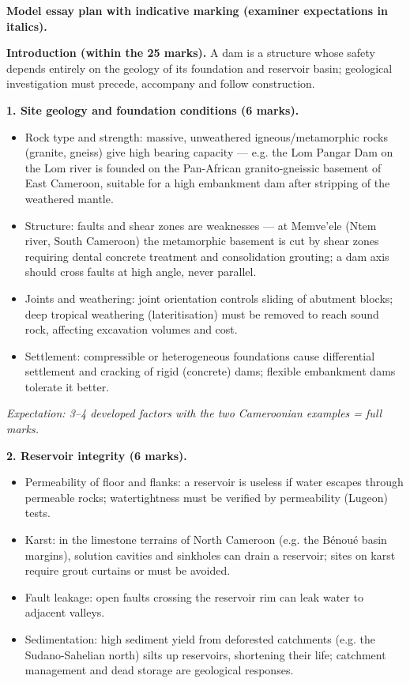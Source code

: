\documentclass[11pt]{article}
\newcommand{\cle}[1]{{\popxbold\color{popdark}#1}}
\begin{document}
\begin{corrige}
\textbf{Model essay plan with indicative marking (examiner expectations in italics).}

\textbf{Introduction (within the 25 marks).} A dam is a structure whose safety depends entirely on the geology of its foundation and reservoir basin; geological investigation must precede, accompany and follow construction.

\textbf{1. Site geology and foundation conditions (6 marks).}
\begin{itemize}
\item Rock type and strength: massive, unweathered igneous/metamorphic rocks (granite, gneiss) give high bearing capacity --- e.g. the \cle{Lom Pangar Dam} on the Lom river is founded on the Pan-African granito-gneissic basement of East Cameroon, suitable for a high embankment dam after stripping of the weathered mantle.
\item Structure: faults and shear zones are weaknesses --- at \cle{Memve'ele} (Ntem river, South Cameroon) the metamorphic basement is cut by shear zones requiring dental concrete treatment and consolidation grouting; a dam axis should cross faults at high angle, never parallel.
\item Joints and weathering: joint orientation controls sliding of abutment blocks; deep tropical weathering (lateritisation) must be removed to reach sound rock, affecting excavation volumes and cost.
\item Settlement: compressible or heterogeneous foundations cause differential settlement and cracking of rigid (concrete) dams; flexible embankment dams tolerate it better.
\end{itemize}
\emph{Expectation: 3--4 developed factors with the two Cameroonian examples = full marks.}

\textbf{2. Reservoir integrity (6 marks).}
\begin{itemize}
\item Permeability of floor and flanks: a reservoir is useless if water escapes through permeable rocks; watertightness must be verified by permeability (Lugeon) tests.
\item Karst: in the limestone terrains of North Cameroon (e.g. the B\'enou\'e basin margins), solution cavities and sinkholes can drain a reservoir; sites on karst require grout curtains or must be avoided.
\item Fault leakage: open faults crossing the reservoir rim can leak water to adjacent valleys.
\item Sedimentation: high sediment yield from deforested catchments (e.g. the Sudano-Sahelian north) silts up reservoirs, shortening their life; catchment management and dead storage are geological responses.
\end{itemize}


\end{corrige}
\end{document}
